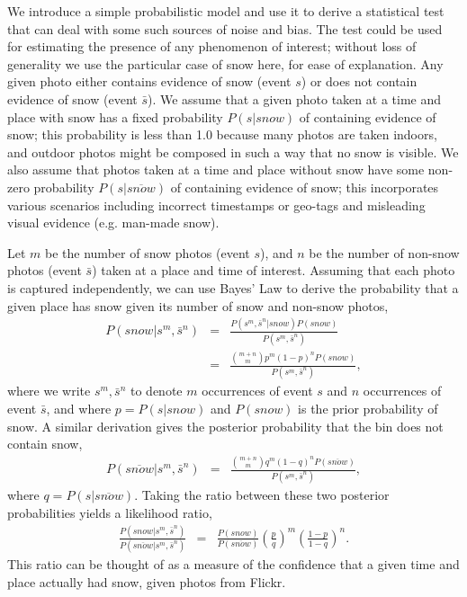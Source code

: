 \documentclass[10pt,journal,compsoc]{IEEEtran}
\begin{document}
  We introduce a simple probabilistic model
and use it to derive a statistical test that can deal with some such
sources of noise and bias. The test could be used for estimating the
presence of any phenomenon of interest; without loss of generality we
use the particular case of snow here, for ease of explanation.  Any
given photo either contains evidence of snow (event $s$) or does not
contain evidence of snow (event $\bar{s}$).  We assume that a given
photo taken at a time and place with snow has a fixed probability $P(s
| snow)$ of containing evidence of snow; this probability is less than
1.0 because many photos are taken indoors, and outdoor photos might be
composed in such a way that no snow is visible. We also assume that
photos taken at a time and place without snow have some non-zero
probability $P(s | \overline{snow})$ of containing evidence of snow;
this incorporates various scenarios including incorrect timestamps or
geo-tags and misleading visual evidence (e.g.  man-made
snow).

Let $m$ be the number of snow
photos (event $s$), and $n$ be the number of non-snow photos (event
$\bar{s}$) taken at a place and time of interest. Assuming that each photo is captured
independently, we can use Bayes' Law to
derive the probability that a given place has snow
given its number of snow and non-snow photos,
%
\newcommand{\smsn}{s^m, \bar{s}^n}
\newcommand{\smsntwo}{s^m, \bar{s}^n}
\begin{eqnarray*}
P(snow|\smsn)  &=&\frac{ P(\smsn|snow)P(snow)}{P(\smsntwo)}  \\
&=&\frac{{m+n\choose m}p^{m}(1-p)^{n}P(snow)}{P(\smsntwo)},  
\end{eqnarray*}
%
where we write $s^m, \bar{s}^n$ to denote $m$ occurrences of event $s$ and $n$ occurrences of event $\bar{s}$, and where $p=P(s|snow)$ and $P(snow)$ is the prior probability of snow. A similar derivation gives the posterior probability that the bin does not contain snow,
%
\begin{eqnarray*}
P(\overline{snow}|\smsn)  &=&\frac{{m+n\choose m}q^{m}(1-q)^{n}P(\overline{snow})}{P(\smsntwo)},  
\end{eqnarray*}
%
where $q=P(s|\overline{snow})$. 
%
Taking the ratio between these two posterior probabilities yields a likelihood ratio,
%
\begin{eqnarray}
\frac{P(snow|\smsn)}{P(\overline{snow}|\smsntwo)}
&=&\frac{P(snow)}{P(\overline{snow})}\left(\frac{p}{q}\right)^{m}\left(\frac{1-p}{1-q}\right)^n.
\label{eq:conf}
\end{eqnarray}
%
This ratio can be thought of as a measure of the confidence that a
given time and place actually had snow, given photos from Flickr.
\end{document}
